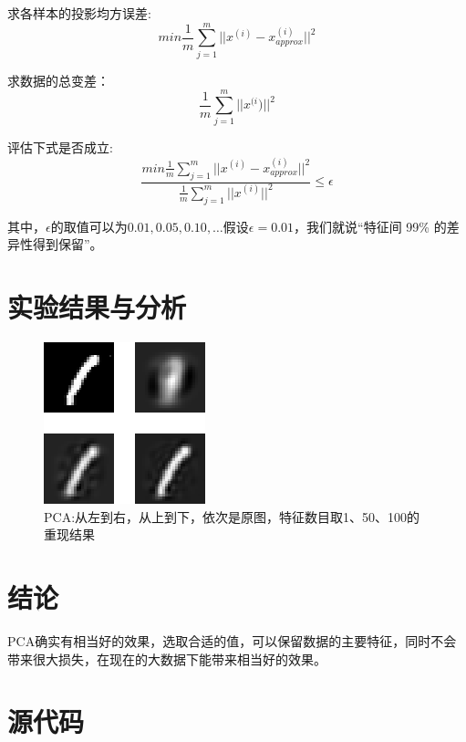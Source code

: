 \documentclass{ML}
\begin{document}
求各样本的投影均方误差:
$$min\frac{1}{m}\sum_{j=1}^{m}||x^{(i)}−x^{(i)}_{approx}||^2$$

求数据的总变差：
$$\frac{1}{m}\sum_{j=1}^{m}||x^{(i})||^2$$

评估下式是否成立:
$$\frac{min\frac{1}{m}\sum_{j=1}^{m}||x^{(i)}−x^{(i)}_{approx}||^2}{\frac{1}{m}\sum_{j=1}^{m}||x^{(i)}||^2} \le \epsilon$$

其中，$\epsilon$的取值可以为$0.01,0.05,0.10,\dots$假设$\epsilon=0.01$，我们就说“特征间 99\% 的差异性得到保留”。
\section{实验结果与分析}

\begin{figure}[H]
	\centering
	\includegraphics[width=0.7\linewidth]{media/PCA/PCA}
	\caption{PCA:从左到右，从上到下，依次是原图，特征数目取1、50、100的重现结果}
	\label{fig:pca}
\end{figure}

\section{结论}

PCA确实有相当好的效果，选取合适的值，可以保留数据的主要特征，同时不会带来很大损失，在现在的大数据下能带来相当好的效果。

\appendix

\section{源代码}

\inputminted[breaklines=true,frame=lines,mathescape=true]{julia}{../PCA.jl}
\end{document}
